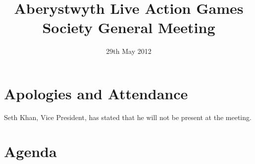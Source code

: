 \documentclass{article}
\newcommand{\society}{Aberystwyth Live Action Games Society}
\begin{document}
\small

\title{\society{} General Meeting}
\date{29th May 2012}
\maketitle{}

\section{Apologies and Attendance}
	Seth Khan, Vice President, has stated that he will not be present at the meeting.

\section{Agenda}
\end{document}
